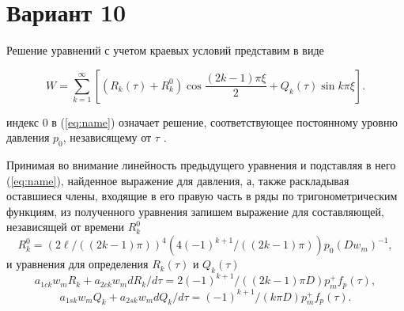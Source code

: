 \documentclass{article}
\begin{document}
    \section*{Вариант 10}
    Решение уравнений с учетом краевых условий представим в виде
    
    \begin{equation}
    W=\sum_{k=1}^{\infty}\left[\left(R_{k}(\tau)+R_{k}^{0}\right) 
    \cos \frac{(2 k-1) \pi \xi}{2}+Q_{k}(\tau) \sin k \pi \xi\right].
    \label{eq:name}
    \end{equation}
    
     индекс 0 в (\ref{eq:name}) означает решение,
    соответствующее постоянному уровню давления
    $p_{0}$, независящему от $\tau$ .
    
    Принимая во внимание линейность предыдущего уравнения и
    подставляя в него (\ref{eq:name}), найденное выражение
    для давления, а, также раскладывая оставшиеся члены, входящие в его
    правую часть в ряды по тригонометрическим функциям, 
    из полученного уравнения запишем
    выражение для составляющей, независящей от времени $R_{k}^{0}$
    \begin{equation*}
    R_{k}^{0}=(2 \ell /((2 k-1) \pi))^{4}\left(4(-1)^{k+1} 
    /((2 k-1) \pi)\right) p_{0}\left(D w_{m}\right)^{-1},
    \end{equation*}
    и уравнения для определения $R_{k}(\tau)$  и  $Q_{k}(\tau)$
    \begin{equation}
    a_{1 c k} w_{m} R_{k}+a_{2 c k} w_{m} d R_{k} / d \tau=2(-1)^{k+1}
    /((2 k-1) \pi D) p_{m}^{+} f_{p}(\tau),
    \end{equation}
    \begin{equation}
    a_{1 s k} w_{m} Q_{k}+a_{2 s k} w_{m} d Q_{k} / d \tau=(-1)^{k+1}
    /(k \pi D) p_{m}^{+} f_{p}(\tau).
    \end{equation}
\end{document}
